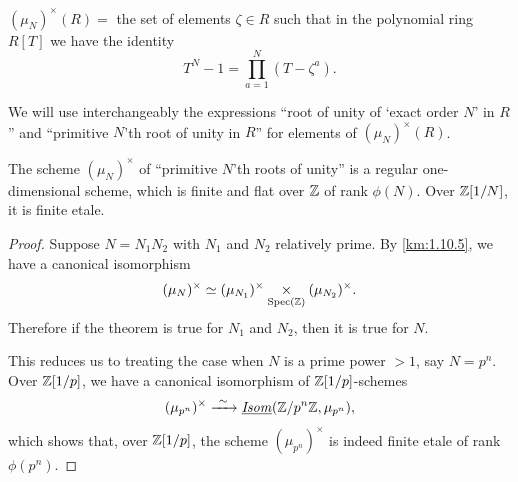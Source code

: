 \kmitem\label{km:1.12.5}
$(\mu_N)^\times(R) =$ the set of elements $\zeta \in R$ such that in the polynomial ring $R[T]$ we have the identity
\[
T^N - 1 = \prod_{a=1}^N (T - \zeta^a).
\]

\kmitem\label{km:1.12.6}
We will use interchangeably the expressions ``root of unity of `exact order $N$' in $R$'' and ``primitive $N$'th root of unity in $R$'' for elements of $(\mu_N)^\times(R)$.

\begin{theorem}\label{thm:1.12.7}
The scheme $(\mu_N)^\times$ of ``primitive $N$'th roots of unity'' is a regular one-dimensional scheme, which is finite and flat over $\mathbb{Z}$ of rank $\phi(N)$. Over $\mathbb{Z}[1/N]$, it is finite etale.
\end{theorem}

\begin{proof}
Suppose $N = N_1 N_2$ with $N_1$ and $N_2$ relatively prime. By \ref{km:1.10.5}, we have a canonical isomorphism
\[
(\mu_N)^\times \simeq (\mu_{N_1})^\times \underset{\operatorname{Spec}(\mathbb{Z})}{\times} (\mu_{N_2})^\times.
\]
Therefore if the theorem is true for $N_1$ and $N_2$, then it is true for $N$.

This reduces us to treating the case when $N$ is a prime power $> 1$, say $N = p^n$. Over $\mathbb{Z}[1/p]$, we have a canonical isomorphism of $\mathbb{Z}[1/p]$-schemes
\[
(\mu_{p^n})^\times \xrightarrow{\ \sim\ } \underline{\mathit{Isom}}(\mathbb{Z}/p^n\mathbb{Z}, \mu_{p^n}),
\]
which shows that, over $\mathbb{Z}[1/p]$, the scheme $(\mu_{p^n})^\times$ is indeed finite etale of rank $\phi(p^n)$.


\end{proof}
